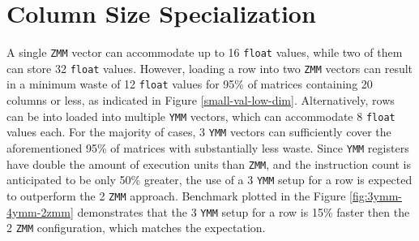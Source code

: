\documentclass[logo,bsc,singlespacing,parskip]{infthesis}
\newcommand{\dtfloat}{\texttt{float}}
\newcommand{\ymm}{\texttt{YMM}}
\newcommand{\zmm}{\texttt{ZMM}}
\begin{document}





\section{Column Size Specialization}
\label{sec:ColumnSizeSpecialization}

A single \zmm{} vector can accommodate up to 16 \dtfloat{} values, while two of
them can store 32 \dtfloat{} values. However, loading a row into two \zmm{}
vectors can result in a minimum waste of 12 \dtfloat{} values for 95\% of
matrices containing 20 columns or less, as indicated in Figure
\ref{small-val-low-dim}. Alternatively, rows can be into loaded into multiple
\ymm{} vectors, which can accommodate 8 \dtfloat{} values each. For the majority
of cases, 3 \ymm{} vectors can sufficiently cover the aforementioned 95\% of
matrices with substantially less waste. Since \ymm{} registers have double the
amount of execution units than \zmm{}, and the instruction count is anticipated
to be only 50\% greater, the use of a 3 \ymm{} setup for a row is expected to
outperform the 2 \zmm{} approach. Benchmark plotted in the Figure
\ref{fig:3ymm-4ymm-2zmm} demonstrates that the 3 \ymm{} setup for a row is 15\%
faster then the 2 \zmm{} configuration, which matches the expectation.
\end{document}
